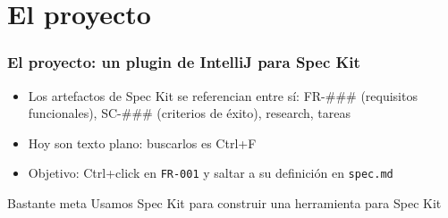 \section{El proyecto}
\begin{frame}
    \frametitle{El proyecto: un plugin de IntelliJ para Spec Kit}
    \begin{itemize}
        \item Los artefactos de Spec Kit se referencian entre sí: FR-\#\#\# (requisitos funcionales), SC-\#\#\# (criterios de éxito), research, tareas
        \item Hoy son texto plano: buscarlos es Ctrl+F
        \item Objetivo: Ctrl+click en \texttt{FR-001} y saltar a su definición en \texttt{spec.md}
    \end{itemize}
    \begin{exampleblock}{Bastante meta}
        Usamos Spec Kit para construir una herramienta para Spec Kit
    \end{exampleblock}
\end{frame}

